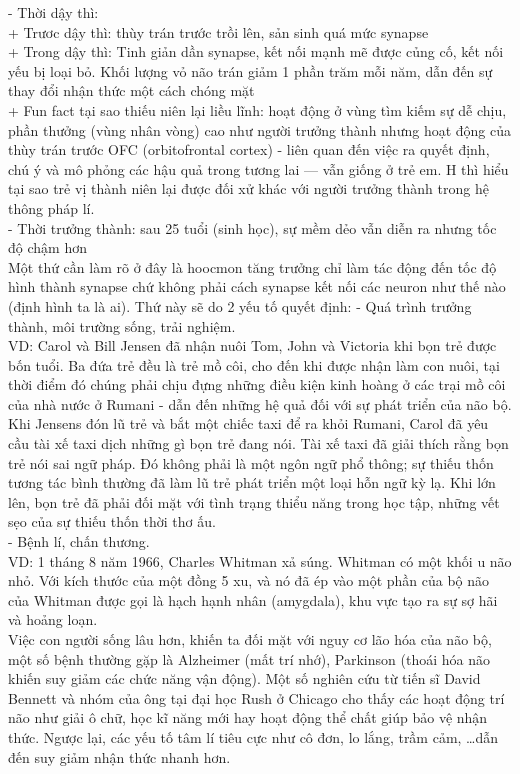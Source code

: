 \documentclass{article}
\newcommand\tab[1][1cm]{\hspace*{#1}}
\begin{document}
\tab\tab - Thời dậy thì:\\
\tab\tab\tab + Trươc dậy thì: thùy trán trước trồi lên, sản sinh quá mức synapse\\
\tab\tab\tab + Trong dậy thì: Tinh giản dần synapse, kết nối mạnh mẽ được củng cố, kết nối yếu bị loại bỏ. Khối lượng vỏ não trán giảm 1 phần trăm mỗi năm, dẫn đến sự thay đổi nhận thức một cách chóng mặt \\
\tab\tab\tab + Fun fact tại sao thiếu niên lại liều lĩnh: hoạt động ở vùng tìm kiếm sự dễ chịu, phần thưởng (vùng nhân vòng) cao như người trưởng thành nhưng hoạt động của thùy trán trước OFC (orbitofrontal cortex) - liên quan đến việc ra quyết định, chú ý và mô phỏng các hậu quả trong tương lai — vẫn giống ở trẻ em. H thì hiểu tại sao trẻ vị thành niên lại được đối xử khác với người trưởng thành trong hệ thông pháp lí.\\
\tab\tab - Thời trưởng thành: sau 25 tuổi (sinh học), sự mềm dẻo vẫn diễn ra nhưng tốc độ chậm hơn\\
\tab Một thứ cần làm rõ ở đây là hoocmon tăng trưởng chỉ làm tác động đến tốc độ hình thành synapse chứ không phải cách synapse kết nối các neuron như thế nào (định hình ta là ai). Thứ này sẽ do 2 yếu tố quyết định:
\tab\tab - Quá trình trưởng thành, môi trường sống, trải nghiệm. \\
\tab\tab VD: Carol và Bill Jensen đã nhận nuôi Tom, John và Victoria khi bọn trẻ được bốn tuổi. Ba đứa trẻ đều là trẻ mồ côi, cho đến khi được nhận làm con nuôi, tại thời điểm đó chúng phải chịu đựng những điều kiện kinh hoàng ở các trại mồ côi của nhà nước ở Rumani - dẫn đến những hệ quả đối với sự phát triển của não bộ. Khi Jensens đón lũ trẻ và bắt một chiếc taxi để ra khỏi Rumani, Carol đã yêu cầu tài xế taxi dịch những gì bọn trẻ đang nói. Tài xế taxi đã giải thích rằng bọn trẻ nói sai ngữ pháp. Đó không phải là một ngôn ngữ phổ thông; sự thiếu thốn tương tác bình thường đã làm lũ trẻ phát triển một loại hỗn ngữ kỳ lạ. Khi lớn lên, bọn trẻ đã phải đối mặt với tình trạng thiểu năng trong học tập, những vết sẹo của sự thiếu thốn thời thơ ấu.\\
\tab\tab - Bệnh lí, chấn thương.\\
\tab\tab VD:  1 tháng 8 năm 1966, Charles Whitman xả súng.  Whitman có một khối u não nhỏ. Với kích thước của một đồng 5 xu, và nó đã ép vào một phần của bộ não của Whitman được gọi là hạch hạnh nhân (amygdala), khu vực tạo ra sự sợ hãi và hoảng loạn.\\
\tab Việc con người sống lâu hơn, khiến ta đối mặt với nguy cơ lão hóa của não bộ, một số bệnh thường gặp là Alzheimer (mất trí nhớ), Parkinson (thoái hóa não khiến suy giảm các chức năng vận động). Một số nghiên cứu từ tiến sĩ David Bennett và nhóm của ông tại đại học Rush ở Chicago cho thấy các hoạt động trí não như giải ô chữ, học kĩ năng mới hay hoạt động thể chất giúp bảo vệ nhận thức. Ngược lại, các yếu tố tâm lí tiêu cực như cô đơn, lo lắng, trầm cảm, \dots dẫn đến suy giảm nhận thức nhanh hơn.\\
\end{document}
